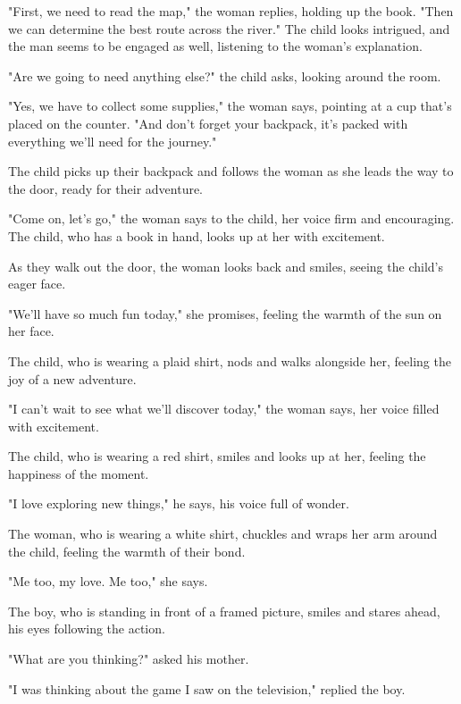 \documentclass[smalldemyvopaper,11pt,twoside,onecolumn,openright,extrafontsizes]{memoir}
\begin{document}
"First, we need to read the map," the woman replies, holding up the book. "Then we can determine the best route across the river." The child looks intrigued, and the man seems to be engaged as well, listening to the woman's explanation.\par
"Are we going to need anything else?" the child asks, looking around the room.\par
"Yes, we have to collect some supplies," the woman says, pointing at a cup that's placed on the counter. "And don't forget your backpack, it's packed with everything we'll need for the journey."\par
The child picks up their backpack and follows the woman as she leads the way to the door, ready for their adventure.\par
"Come on, let's go," the woman says to the child, her voice firm and encouraging. The child, who has a book in hand, looks up at her with excitement.\par
As they walk out the door, the woman looks back and smiles, seeing the child's eager face.\par
"We'll have so much fun today," she promises, feeling the warmth of the sun on her face.\par
The child, who is wearing a plaid shirt, nods and walks alongside her, feeling the joy of a new adventure.\par
"I can't wait to see what we'll discover today," the woman says, her voice filled with excitement.\par
The child, who is wearing a red shirt, smiles and looks up at her, feeling the happiness of the moment.\par
"I love exploring new things," he says, his voice full of wonder.\par
The woman, who is wearing a white shirt, chuckles and wraps her arm around the child, feeling the warmth of their bond.\par
"Me too, my love. Me too," she says.\par
The boy, who is standing in front of a framed picture, smiles and stares ahead, his eyes following the action.\par
"What are you thinking?" asked his mother.\par
"I was thinking about the game I saw on the television," replied the boy.\par
\end{document}
